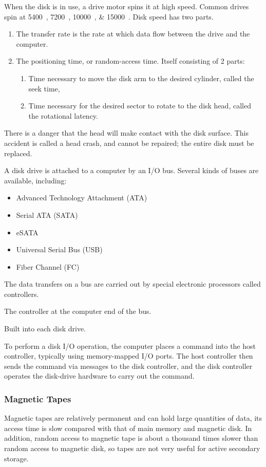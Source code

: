 When the disk is in use, a drive motor spins it at high speed.
Common drives spin at \SIlist{5400; 7200; 10000; 15000}{\rpm}.
Disk speed has two parts.
\begin{enumerate}[noitemsep]
\item The transfer rate is the rate at which data flow between the drive and the computer.
\item The positioning time, or random-access time. Itself consisting of 2 parts:
  \begin{enumerate}[noitemsep]
  \item Time necessary to move the disk arm to the desired cylinder, called the seek time,
  \item Time necessary for the desired sector to rotate to the disk head, called the rotational latency.
  \end{enumerate}
\end{enumerate}

There is a danger that the head will make contact with the disk surface.
This accident is called a head crash, and cannot be repaired; the entire disk must be replaced.

A disk drive is attached to a computer by an I/O bus.
Several kinds of buses are available, including:
\begin{itemize}[noitemsep]
\item Advanced Technology Attachment (ATA)
\item Serial ATA (SATA)
\item eSATA
\item Universal Serial Bus (USB)
\item Fiber Channel (FC)
\end{itemize}

The data transfers on a bus are carried out by special electronic processors called controllers.
\begin{description}[noitemsep]
\item[Host Controller:] The controller at the computer end of the bus.
\item[Disk Controller:] Built into each disk drive.
\end{description}

To perform a disk I/O operation, the computer places a command into the host controller, typically using memory-mapped I/O ports.
The host controller then sends the command via messages to the disk controller, and the disk controller operates the disk-drive hardware to carry out the command.

\subsubsection{Magnetic Tapes}\label{subsubsec:Magnetic_Tapes}
Magnetic tapes are relatively permanent and can hold large quantities of data, its access time is slow compared with that of main memory and magnetic disk.
In addition, random access to magnetic tape is about a thousand times slower than random access to magnetic disk, so tapes are not very useful for active secondary storage.

